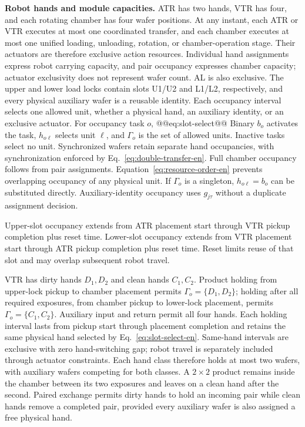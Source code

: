 \noindent\textbf{Robot hands and module capacities.}
ATR has two hands, VTR has four, and each rotating chamber has four wafer positions. At any instant, each ATR or VTR executes at most one coordinated transfer, and each chamber executes at most one unified loading, unloading, rotation, or chamber-operation stage. Their actuators are therefore exclusive action resources. Individual hand assignments express robot carrying capacity, and pair occupancy expresses chamber capacity; actuator exclusivity does not represent wafer count. AL is also exclusive. The upper and lower load locks contain slots U1/U2 and L1/L2, respectively, and every physical auxiliary wafer is a reusable identity. Each occupancy interval selects one allowed unit, whether a physical hand, an auxiliary identity, or an exclusive actuator. For occupancy task $o$,
@@eq:slot-select@@
Binary $b_o$ activates the task, $h_{o\ell}$ selects unit $\ell$, and $\Gamma_o$ is the set of allowed units. Inactive tasks select no unit. Synchronized wafers retain separate hand occupancies, with synchronization enforced by Eq.~\eqref{eq:double-transfer-en}. Full chamber occupancy follows from pair assignments. Equation~\eqref{eq:resource-order-en} prevents overlapping occupancy of any physical unit. If $\Gamma_o$ is a singleton, $h_{o\ell}=b_o$ can be substituted directly. Auxiliary-identity occupancy uses $g_{j\tau}$ without a duplicate assignment decision.

Upper-slot occupancy extends from ATR placement start through VTR pickup completion plus reset time. Lower-slot occupancy extends from VTR placement start through ATR pickup completion plus reset time. Reset limits reuse of that slot and may overlap subsequent robot travel.

VTR has dirty hands $D_1,D_2$ and clean hands $C_1,C_2$. Product holding from upper-lock pickup to chamber placement permits $\Gamma_o=\{D_1,D_2\}$; holding after all required exposures, from chamber pickup to lower-lock placement, permits $\Gamma_o=\{C_1,C_2\}$. Auxiliary input and return permit all four hands. Each holding interval lasts from pickup start through placement completion and retains the same physical hand selected by Eq.~\eqref{eq:slot-select-en}. Same-hand intervals are exclusive with zero hand-switching gap; robot travel is separately included through actuator constraints. Each hand class therefore holds at most two wafers, with auxiliary wafers competing for both classes. A $2\times2$ product remains inside the chamber between its two exposures and leaves on a clean hand after the second. Paired exchange permits dirty hands to hold an incoming pair while clean hands remove a completed pair, provided every auxiliary wafer is also assigned a free physical hand.

